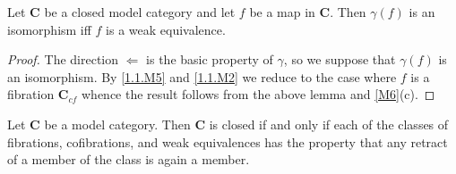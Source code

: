 \documentclass[../main]{subfiles}
\begin{document}
\begin{proposition}\label{prop:1.5.1}
Let $\mathbf C$ be a closed model category and let $f$ be a map in $\mathbf C$. Then $\gamma(f)$ is an isomorphism iff $f$ is a weak equivalence. 
\end{proposition} 

\begin{proof}
The direction $\Leftarrow$ is the basic property of $\gamma$, so we suppose that $\gamma(f)$ is an isomorphism. By \ref{1.1.M5} and \ref{1.1.M2} we reduce to the case where $f$ is a fibration $\mathbf C_{cf}$ whence the result follows from the above lemma and \ref{M6}(c).
\end{proof} 

\begin{proposition}\label{prop:1.5.2}
Let $\mathbf C$ be a model category. Then $\mathbf C$ is closed if and only if each of the classes of fibrations, cofibrations, and weak equivalences has the property that any retract of a member of the class is again a member. 
\end{proposition} 
\end{document}
